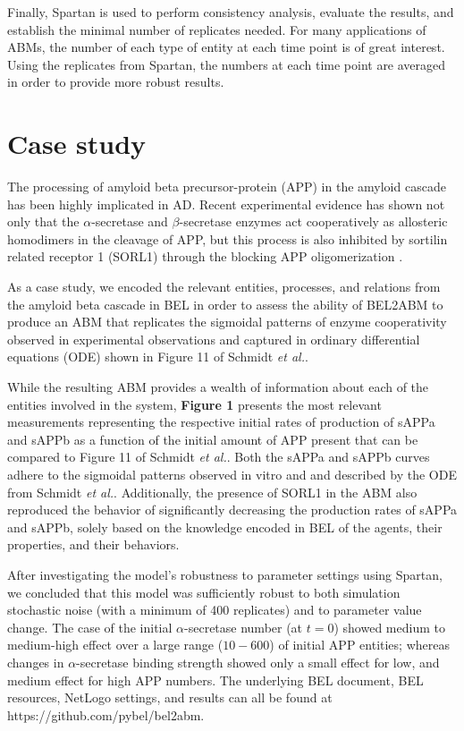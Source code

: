 \documentclass{bioinfo}
\begin{document}
Finally, Spartan \citep{Alden14} is used to perform consistency analysis, evaluate the results, and establish the minimal number of replicates needed. For many applications of ABMs, the number of each type of entity at each time point is of great interest. Using the replicates from Spartan, the numbers at each time point are averaged in order to provide more robust results.

\section{Case study}

The processing of amyloid beta precursor-protein (APP) in the amyloid cascade has been highly implicated in AD. Recent experimental evidence has shown not only that the $\alpha$-secretase and $\beta$-secretase enzymes act cooperatively as allosteric homodimers in the cleavage of APP, but this process is also inhibited by sortilin related receptor 1 (SORL1) through the blocking APP oligomerization \citep{Schmidt12}. 

As a case study, we encoded the relevant entities, processes, and relations from the amyloid beta cascade in BEL in order to assess the ability of BEL2ABM to produce an ABM that replicates the sigmoidal patterns of enzyme cooperativity observed in experimental observations and captured in ordinary differential equations (ODE) shown in Figure 11 of Schmidt {\it et al.}.

While the resulting ABM provides a wealth of information about each of the entities involved in the system, \textbf{Figure 1} presents the most relevant measurements representing the respective initial rates of production of sAPPa and sAPPb as a function of the initial amount of APP present that can be compared to Figure 11 of Schmidt {\it et al.}. Both the sAPPa and sAPPb curves adhere to the sigmoidal patterns observed in vitro and and described by the ODE from Schmidt {\it et al.}. Additionally, the presence of SORL1 in the ABM also reproduced the behavior of significantly decreasing the production rates of sAPPa and sAPPb, solely based on the knowledge encoded in BEL of the agents, their properties, and their behaviors.

After investigating the model's robustness to parameter settings using Spartan, we concluded that this model was 
sufficiently robust to both simulation stochastic noise (with a minimum of 400 replicates) and to 
parameter value change. The case of the initial $\alpha$-secretase number (at $t=0$) showed medium to 
medium-high effect over a large range ($10-600$) of initial APP entities; whereas changes in $\alpha$-secretase  binding strength showed only a small effect for low, and medium effect for high APP numbers. The underlying BEL document, BEL resources, NetLogo settings, and results can all be found at https://github.com/pybel/bel2abm.
\end{document}
